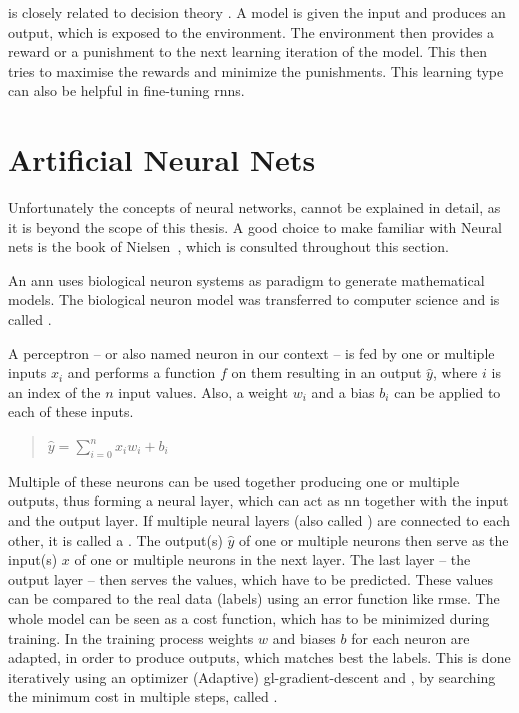
 is closely related to decision theory \cite{ghahramani2003unsupervised}.
A model is given the input and produces an output, which is exposed to the environment.
The environment then provides a reward or a punishment to the next learning iteration of the model.
This then tries to maximise the rewards and minimize the punishments.
This learning type can also be helpful in fine-tuning \gls{rnn}s.

\section{Artificial Neural Nets}
\label{sec:neural-net-classes}

Unfortunately the concepts of neural networks, cannot be explained in detail, as it is beyond the scope of this thesis.
A good choice to make familiar with Neural nets is the book  of Nielsen~\cite{nielsen2015neural}, which is consulted throughout this section.

An \gls{ann} uses biological neuron systems as paradigm to generate mathematical models.
The biological neuron model was transferred to computer science and is called .

A perceptron -- or also named neuron in our context -- is fed by one or multiple inputs $x_i$ and performs a function $f$ on them resulting in an output $\hat{y}$, where $i$ is an index of the $n$ input values.
Also, a weight $w_i$ and a bias $b_i$ can be applied to each of these inputs.

\begin{quote}
    \begin{math}
        \hat{y} = \sum_{i=0}^{n} x_i w_i+b_i
    \end{math}\newline
\end{quote}

Multiple of these neurons can be used together producing one or multiple outputs, thus forming a neural layer, which can act as \gls{nn} together with the input and the output layer.
If multiple neural layers (also called ) are connected to each other, it is called a .
The output(s) $\hat{y}$ of one or multiple neurons then serve as the input(s) $x$ of one or multiple neurons in the next layer.
The last layer -- the output layer -- then serves the values, which have to be predicted.
These values can be compared to the real data (labels) using an error function like \gls{rmse}.
The whole model can be seen as a cost function, which has to be minimized during training.
In the training process weights $w$ and biases $b$ for each neuron are adapted, in order to produce outputs, which matches best the labels.
This is done iteratively using an optimizer (Adaptive) \Gls{gl-gradient-descent} and , by searching the minimum cost in multiple steps, called .


